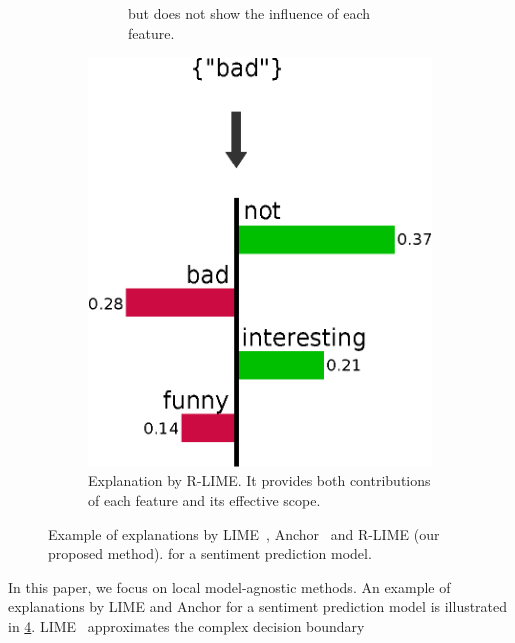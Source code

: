 \documentclass[11pt]{article}
\begin{document}
\begin{figure}[tbp]
\begin{subfigure}[t]{0.45\textwidth}
\begin{subfigure}[t]{\textwidth}
{				but does not show the influence of each feature.
			}\label{fig:example-anchor}
		\end{subfigure}
	\end{subfigure}
	\hspace{0.3cm}
	\begin{subfigure}[t]{0.45\textwidth}
		\centering
		\vspace{-2.24cm}
		\includegraphics[scale=\scale]{example-rlime}
		\caption{%
			Explanation by R-LIME\@.
			It provides both contributions of each feature and
			its effective scope.
		}\label{fig:example-rlime}
	\end{subfigure}
	\caption[Example of explanations by LIME, Anchor and R-LIME]{%
		Example of explanations by LIME~\cite{ribeiro2016why},
		Anchor~\cite{ribeiro2018anchors} and R-LIME (our proposed method).
		for a sentiment prediction model.
	}\label{fig:example}
\end{figure}
In this paper,
we focus on local model-agnostic methods.
An example of explanations by LIME and Anchor
for a sentiment prediction model is illustrated in \cref{fig:example}.
LIME~\cite{ribeiro2016why} approximates the complex decision boundary
\end{document}
